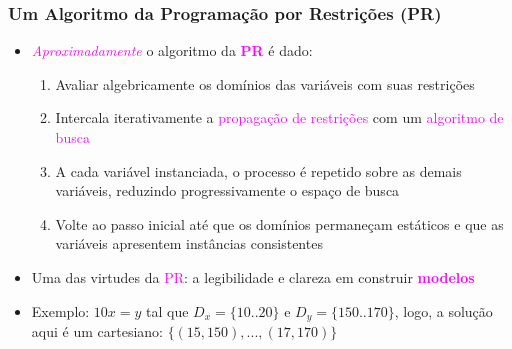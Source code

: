 \documentclass{beamer}
\begin{document}
\begin{frame}[fragile]

\frametitle{Um Algoritmo da Programação por Restrições (PR)}

   \begin{block}{}
     \begin{itemize}
     
      \item \textcolor{magenta}{\textit{Aproximadamente} } o algoritmo da \textbf{\textcolor{magenta}{PR}} é dado:
          \begin{enumerate}

            \item Avaliar algebricamente  os domínios das variáveis com suas restrições

            \item Intercala iterativamente a \textcolor{magenta}{\textsf{propagação de restrições}} com  um \textcolor{magenta}{\textsf{algoritmo de busca}}

            \item A cada variável instanciada, o processo é repetido sobre as demais variáveis, reduzindo progressivamente o espaço de busca

            \item Volte ao passo inicial até que os domínios permaneçam estáticos
            e que as variáveis apresentem instâncias consistentes
              
          \end{enumerate}
       
        \pause
       \item Uma das virtudes da \textcolor{magenta}{PR}: 
       a legibilidade e clareza em construir \textcolor{magenta}{\textbf{modelos} }
       \item Exemplo: $10x = y$ tal que $D_x = \{10..20\}$ e $D_y =\{150..170\}$, logo, a solução aqui é um cartesiano: 
       \underline {$\{(15,150) , ..., (17,170) \}$ }
       
    \end{itemize}
    
    \end{block}
    
\end{frame}
\end{document}
